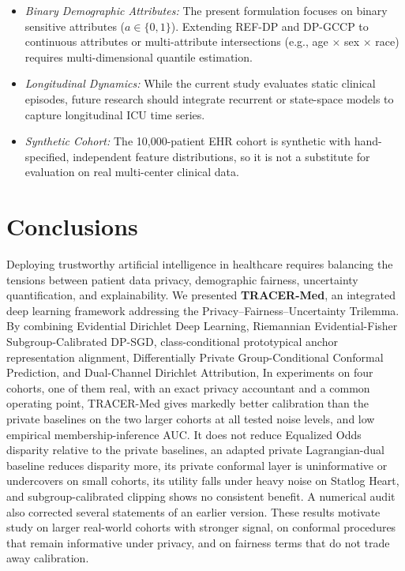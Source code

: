 \documentclass[pdflatex,sn-vancouver-num,referee,lineno]{sn-jnl}
\theoremstyle{thmstyleone}
\theoremstyle{thmstylethree}
\begin{document}
\begin{itemize}
    \item \emph{Binary Demographic Attributes:} The present formulation focuses on binary sensitive attributes ($a \in \{0, 1\}$). Extending REF-DP and DP-GCCP to continuous attributes or multi-attribute intersections (e.g., age $\times$ sex $\times$ race) requires multi-dimensional quantile estimation.
    \item \emph{Longitudinal Dynamics:} While the current study evaluates static clinical episodes, future research should integrate recurrent or state-space models to capture longitudinal ICU time series.
    \item \emph{Synthetic Cohort:} The 10,000-patient EHR cohort is synthetic with hand-specified, independent feature distributions, so it is not a substitute for evaluation on real multi-center clinical data.
\end{itemize}

\section{Conclusions}
\label{sec:conclusion}
Deploying trustworthy artificial intelligence in healthcare requires balancing the tensions between patient data privacy, demographic fairness, uncertainty quantification, and explainability. We presented \textbf{TRACER-Med}, an integrated deep learning framework addressing the Privacy--Fairness--Uncertainty Trilemma. By combining Evidential Dirichlet Deep Learning, Riemannian Evidential-Fisher Subgroup-Calibrated DP-SGD, class-conditional prototypical anchor representation alignment, Differentially Private Group-Conditional Conformal Prediction, and Dual-Channel Dirichlet Attribution, In experiments on four cohorts, one of them real, with an exact privacy accountant and a common operating point, TRACER-Med gives markedly better calibration than the private baselines on the two larger cohorts at all tested noise levels, and low empirical membership-inference AUC. It does not reduce Equalized Odds disparity relative to the private baselines, an adapted private Lagrangian-dual baseline reduces disparity more, its private conformal layer is uninformative or undercovers on small cohorts, its utility falls under heavy noise on Statlog Heart, and subgroup-calibrated clipping shows no consistent benefit. A numerical audit also corrected several statements of an earlier version. These results motivate study on larger real-world cohorts with stronger signal, on conformal procedures that remain informative under privacy, and on fairness terms that do not trade away calibration.
\end{document}
